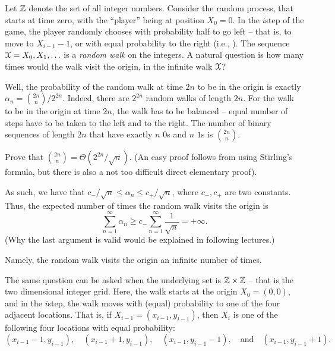 
Let $\mathbb{Z}$ denote the set of all integer numbers. Consider the random
process, that starts at time zero, with the ``player'' being at
position $X_0=0$. In the $i$\th step of the game, the player randomly
chooses with probability half to go left -- that is, to move to
$X_{i-1}-1$, or with equal probability to the right (i.e.,
). The sequence $\EuScript{X} = X_0, X_1, \ldots$ is a
\emph{random walk} on the integers. A natural question is how many
times would the walk visit the origin, in the infinite walk
$\EuScript{X}$?

Well, the probability of the random walk at time $2n$ to be in the
origin is exactly $\alpha_n = \binom{2n}{n} /2^{2n}$. Indeed, there
are $2^{2n}$ random walks of length $2n$. For the walk to be in the
origin at time $2n$, the walk has to be balanced -- equal number of
steps have to be taken to the left and to the right. The number of
binary sequences of length $2n$ that have exactly $n$ $0$s and $n$
$1$s is $\binom{2n}{n}$.

\begin{exercise}
    Prove that $\binom{2n}{n} = \Theta(2^{2n} /\sqrt{n})$. (An easy
    proof follows from using Stirling's formula, but there is also a
    not too difficult direct elementary proof).
\end{exercise}

As such, we have that
$c_- /\sqrt{n} \leq \alpha_n \leq c_+ /\sqrt{n}$, where $c_-, c_+$ are
two constants. Thus, the expected number of times the random walk
visits the origin is
\begin{equation*}
    \sum_{n=1}^\infty \alpha_n%
    \geq  %
    c_- \sum_{n=1}^\infty \frac{1}{\sqrt{n}}%
    =%
    +\infty.
\end{equation*}
(Why the last argument is valid would be explained in following
lectures.)

Namely, the random walk visits the origin an infinite number of times. 


The same question can be asked when the underlying set is $\mathbb{Z} \times
\mathbb{Z}$ -- that is the two dimensional integer grid. Here, the walk
starts at the origin $X_0 = (0,0)$, and in the $i$\th step, the walk
moves with (equal) probability to one of the four adjacent
locations. That is, if $X_{i-1} = (x_{i-1}, y_{i-1})$, then $X_i$ is
one of the following four locations with equal probability:
\begin{equation*}
    (x_{i-1}-1,y_{i-1}),\quad
    (x_{i-1}+1,y_{i-1}),\quad
    (x_{i-1},y_{i-1}-1),%
    \text{ ~ and ~ }%
    (x_{i-1},y_{i-1}+1).    
\end{equation*}

